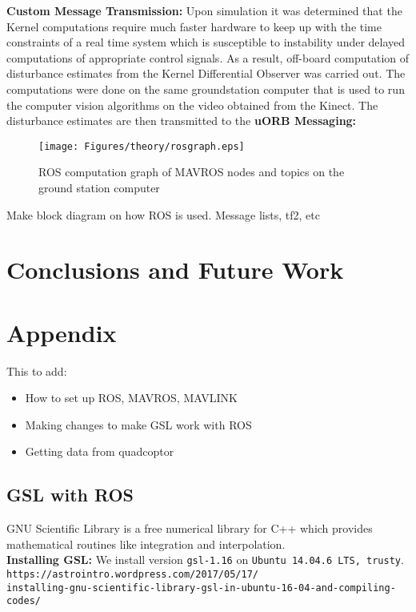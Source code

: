 \documentclass{article}
\begin{document}
\textbf{Custom Message Transmission:} Upon simulation it was determined that the Kernel computations require much faster hardware to keep up with the time constraints of a real time system which is susceptible to instability under delayed computations of appropriate control signals. As a result, off-board computation of disturbance estimates from the Kernel Differential Observer was carried out. The computations were done on the same groundstation computer that is used to run the computer vision algorithms on the video obtained from the Kinect. The disturbance estimates are then transmitted to the 
\textbf{uORB Messaging:} \\

\begin{figure}[H]
\centering
\texttt{[image: Figures/theory/rosgraph.eps]}
\caption{ROS computation graph of MAVROS nodes and topics on the ground station computer}
\label{rosgraph}
\end{figure}

Make block diagram on how ROS is used. Message lists, tf2, etc 

\section{Conclusions and Future Work}

\section{Appendix}
This to add: 
\begin{itemize}
	\item How to set up ROS, MAVROS, MAVLINK
	\item Making changes to make GSL work with ROS
	\item Getting data from quadcoptor 
\end{itemize}

\subsection{GSL with ROS}
GNU Scientific Library is a free numerical library for C++ which provides mathematical routines like integration and interpolation. 
\\\textbf{Installing GSL:} We install version \texttt{gsl-1.16} on \texttt{Ubuntu 14.04.6 LTS, trusty}.
\texttt{https://astrointro.wordpress.com/2017/05/17/ \\ installing-gnu-scientific-library-gsl-in-ubuntu-16-04-and-compiling-codes/}
\end{document}
